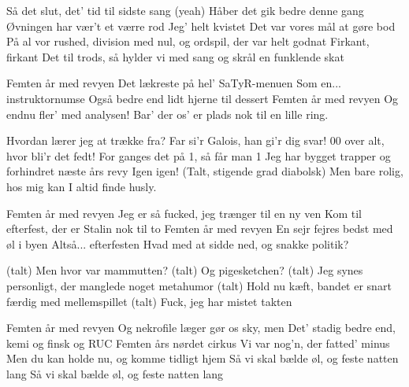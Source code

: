 \documentclass[a4paper,11pt]{article}
\begin{document}
\begin{song}
 Så det slut, det' tid til sidste sang (yeah)
Håber det gik bedre denne gang
 Øvningen har vær't et værre rod
Jeg' helt kvistet
 Det var vores mål at gøre bod
 På al vor rushed, division med nul, og ordspil, der var helt godnat
Firkant, firkant
 Det til trods, så hylder vi med sang og skrål en funklende skat

 Femten år med revyen
 Det lækreste på hel' SaTyR-menuen
Som en... instruktornumse
 Også bedre end lidt hjerne til dessert
 Femten år med revyen
 Og endnu fler' med analysen!
 Bar' der os' er plads nok til en lille ring.

 Hvordan lærer jeg at trække fra?
 Far si'r Galois, han gi'r dig svar!
 00 over alt, hvor bli'r det fedt!
 For ganges det på 1, så får man 1
 Jeg har bygget trapper og forhindret næste års revy
Igen igen!
 (Talt, stigende grad diabolsk) Men bare rolig, hos mig kan I altid finde husly.

 Femten år med revyen
 Jeg er så fucked, jeg trænger til en ny ven
 Kom til efterfest, der er Stalin nok til to
 Femten år med revyen
 En sejr fejres bedst med øl i byen
Altså... efterfesten
 Hvad med at sidde ned, og snakke politik?

 (talt) Men hvor var mammutten?
 (talt) Og pigesketchen?
 (talt) Jeg synes personligt, der manglede noget metahumor
 (talt) Hold nu kæft, bandet er snart færdig med mellemspillet
 (talt) Fuck, jeg har mistet takten

 Femten år med revyen
 Og nekrofile læger gør os sky, men
 Det' stadig bedre end, kemi og finsk og RUC
 Femten års nørdet cirkus
\sings{=} Vi var nog'n, der fatted' minus
 Men du kan holde nu, og komme tidligt hjem
 Så vi skal bælde øl, og feste natten lang
Så vi skal bælde øl, og feste natten lang
\end{song}
\end{document}
